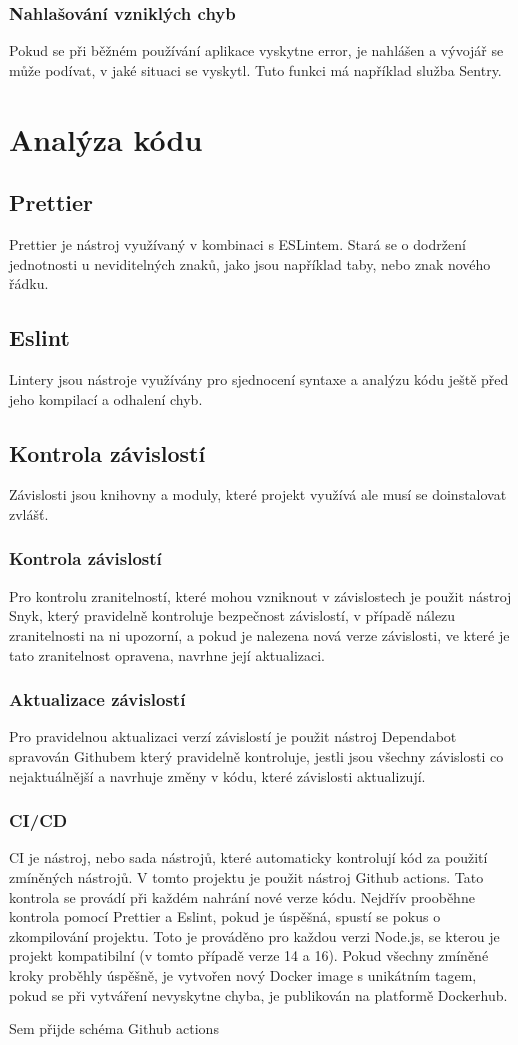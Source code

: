 \subsubsection{Nahlašování vzniklých chyb}
Pokud se při běžném používání aplikace vyskytne error, je nahlášen a 
vývojář se může podívat, v jaké situaci se vyskytl. Tuto funkci má například
služba Sentry.
\section{Analýza kódu}  
\subsection{Prettier}
Prettier je nástroj využívaný v kombinaci s ESLintem. Stará
se o dodržení jednotnosti u neviditelných znaků,
jako jsou například taby, nebo znak nového řádku.
\subsection{Eslint}
Lintery jsou nástroje využívány pro sjednocení syntaxe a 
analýzu kódu ještě před jeho kompilací
a odhalení chyb.
\subsection{Kontrola závislostí}
Závislosti jsou knihovny a moduly, které projekt využívá 
ale musí se doinstalovat zvlášť.
\subsubsection{Kontrola závislostí}
Pro kontrolu zranitelností, které mohou vzniknout v závislostech je 
použit nástroj Snyk, který pravidelně kontroluje bezpečnost závislostí,
v případě nálezu zranitelnosti na ni upozorní, a pokud je nalezena nová
verze závislosti, ve které je tato zranitelnost opravena, navrhne její aktualizaci.
\subsubsection{Aktualizace závislostí}
Pro pravidelnou aktualizaci verzí závislostí je použit nástroj Dependabot spravován Githubem
který pravidelně kontroluje, jestli jsou všechny závislosti co nejaktuálnější
a navrhuje změny v kódu, které závislosti aktualizují.
\subsubsection{CI/CD}
CI je nástroj, nebo sada nástrojů, které automaticky kontrolují kód za použití zmíněných nástrojů.
V tomto projektu je použit nástroj Github actions. Tato kontrola se provádí 
při každém nahrání nové verze kódu. Nejdřív prooběhne kontrola pomocí Prettier a Eslint, pokud je úspěšná,
spustí se pokus o zkompilování projektu. Toto je prováděno pro každou verzi Node.js, se kterou
je projekt kompatibilní (v tomto případě verze 14 a 16). Pokud všechny zmíněné kroky proběhly úspěšně,
je vytvořen nový Docker image s unikátním tagem, pokud se při vytváření nevyskytne chyba, je publikován 
na platformě Dockerhub.

Sem přijde schéma Github actions